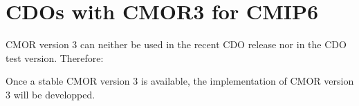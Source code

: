 \section{CDOs with CMOR3 for CMIP6}

CMOR version 3 can neither be used in the recent CDO release nor in the CDO test version. Therefore:

\vspace{5mm}
\noindent\hspace*{10mm}%

Once a stable CMOR version 3 is available, the implementation of CMOR version 3 will be developped. 
 

